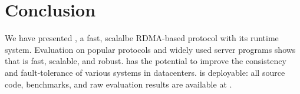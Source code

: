 \section{Conclusion}\label{sec:conclusion}

We have presented \xxx, a fast, scalalbe RDMA-based \paxos protocol with its 
runtime system. Evaluation on popular \paxos protocols and widely used server 
programs shows that \xxx is fast, scalable, and robust. \xxx has the potential 
to improve the consistency and fault-tolerance of various systems in 
datacenters. \xxx is deployable: all source code, benchmarks, and raw 
evaluation results are available at \github.

